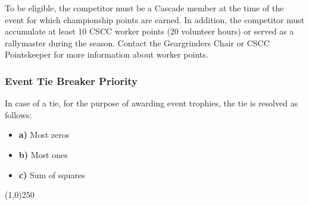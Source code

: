 To be eligible, the competitor must be a Cascade member at the time of the event for which championship points are earned. In addition, the competitor must accumulate at least 10 CSCC worker points (20 volunteer hours) or served as a rallymaster during the season. Contact the Geargrinders Chair or CSCC Pointskeeper for more information about worker points.

\subsubsection{Event Tie Breaker Priority}
In case of a tie, for the purpose of awarding event trophies, the tie is resolved as follows:
\begin{itemize}
\item \textbf{a)} Most zeros
\item \textbf{b)} Most ones
\item \textbf{c)} Sum of squares
\end{itemize}

\begin{center}
\line(1,0){250}
\end{center}
